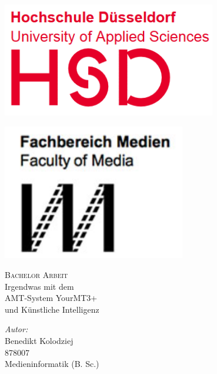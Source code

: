 \begin{titlepage}
    \thispagestyle{empty}

    \vspace*{1cm} %
    \begin{minipage}{0.45\textwidth}
        \raggedright
        \includegraphics[width=0.7\textwidth]{Graphics/HSDLogo} %
    \end{minipage}%
    \hfill
    \begin{minipage}{0.45\textwidth}
        \raggedleft
        \includegraphics[width=0.6\textwidth]{Graphics/FacultyOfMedia} %
    \end{minipage}

    \vspace{1.5cm} %

    \center

    \textsc{\Large Bachelor Arbeit}\\[2cm]

    \huge{Irgendwas mit dem}\\[0.2cm]
    \huge{AMT-System YourMT3+}\\[0.2cm]
    \huge{und Künstliche Intelligenz}\\[2cm]
    \Large

    \begin{center}
        \textit{Autor:} \\
        Benedikt Kolodziej \\
        878007 \\
        Medieninformatik (B. Sc.) \\[1cm]


\end{center}
\end{titlepage}
